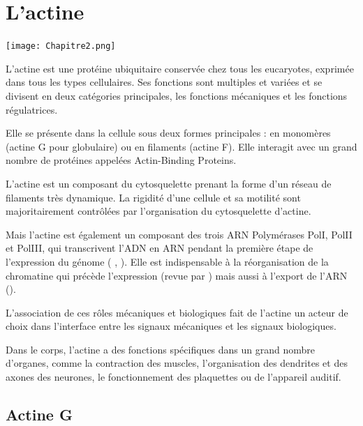 %
%
%
%
%
%
\chapter{L'actine}
\begin{center}
\texttt{[image: Chapitre2.png]}

\end{center}
\newpage
L'actine est une protéine ubiquitaire conservée chez tous les eucaryotes, exprimée dans tous les types cellulaires. 
Ses fonctions sont multiples et variées et se divisent en deux catégories principales, les fonctions mécaniques et les fonctions régulatrices. 

Elle se présente dans la cellule sous deux formes principales : en monomères (actine G pour globulaire) ou en filaments (actine F). 
Elle interagit avec un grand nombre de protéines appelées Actin-Binding Proteins. 

L'actine est un composant du cytosquelette prenant la forme d'un réseau de filaments très dynamique. La rigidité d'une cellule et sa motilité sont majoritairement contrôlées par l'organisation du cytosquelette d'actine. 

Mais l'actine est également un composant des trois ARN Polymérases PolI, PolII et PolIII, qui transcrivent l'ADN en ARN pendant la première étape de l'expression du génome ( \cite{ye_nuclear_2008}, \cite{hofmann_actin_2004} \cite{hu_role_2004}). 
Elle est indispensable à la réorganisation de la chromatine qui précède l'expression (revue par \cite{farrants_chromatin_2008}) mais aussi à l'export de l'ARN (\cite{hofmann_cofactor_2001}).  

L'association de ces rôles mécaniques et biologiques fait de l'actine un acteur de choix dans l'interface entre les signaux mécaniques et les signaux biologiques. 

Dans le corps, l'actine a des fonctions spécifiques dans un grand nombre d'organes, comme la contraction des muscles, l'organisation des dendrites et des axones des neurones, le fonctionnement des plaquettes ou de l'appareil auditif. 



\section{Actine G}

